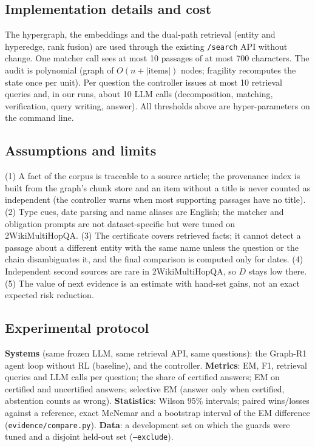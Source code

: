 \subsection{Implementation details and cost}
The hypergraph, the embeddings and the dual-path retrieval (entity and hyperedge, rank fusion) are used through the existing \texttt{/search} API
without change. One matcher call sees at most 10 passages of at most 700 characters. The audit is polynomial (graph of $O(n+|\text{items}|)$ nodes; fragility
recomputes the state once per unit). Per question the controller issues at most 10 retrieval queries and, in our runs, about 10 LLM calls (decomposition, matching, verification,
query writing, answer). All thresholds above are hyper-parameters on the command line.

\subsection{Assumptions and limits}
(1) A fact of the corpus is traceable to a source article; the provenance index is built from the graph's chunk store and an item without a title is never counted as independent
(the controller warns when most supporting passages have no title). (2) Type cues, date parsing and name aliases are English; the matcher and obligation prompts are not
dataset-specific but were tuned on 2WikiMultiHopQA. (3) The certificate covers retrieved facts; it cannot detect a passage about a different entity with the same name
unless the question or the chain disambiguates it, and the final comparison is computed only for dates. (4) Independent second sources are rare in 2WikiMultiHopQA, so $D$ stays low there. (5) The value
of next evidence is an estimate with hand-set gains, not an exact expected risk reduction.

\subsection{Experimental protocol}
\textbf{Systems} (same frozen LLM, same retrieval API, same questions): the Graph-R1 agent loop without RL (baseline), and the controller.
\textbf{Metrics}: EM, F1, retrieval queries and LLM calls per question; the share of certified answers; EM on certified and uncertified answers; selective EM
(answer only when certified, abstention counts as wrong). \textbf{Statistics}: Wilson 95\% intervals; paired wins/losses against a reference, exact McNemar and a bootstrap interval of the EM difference
(\texttt{evidence/compare.py}). \textbf{Data}: a development set on which the guards were tuned and a disjoint held-out set (\texttt{--exclude}).


